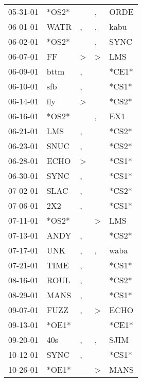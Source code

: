 \begin{supertabular}{lllll}
 05-31-01 &  *OS2* &               &             , &   ORDE \\
 06-01-01 &   WATR &             , &             , &   kabu \\
 06-02-01 &  *OS2* &               &             , &   SYNC \\
 06-07-01 &     FF &  \textgreater &  \textgreater &    LMS \\
 06-09-01 &   bttm &             , &               &  *CE1* \\
 06-10-01 &    sfb &             , &               &  *CS1* \\
 06-14-01 &    fly &  \textgreater &               &  *CS2* \\
 06-16-01 &  *OS2* &               &             , &    EX1 \\
 06-21-01 &    LMS &             , &               &  *CS2* \\
 06-23-01 &   SNUC &             , &               &  *CS2* \\
 06-28-01 &   ECHO &  \textgreater &               &  *CS1* \\
 06-30-01 &   SYNC &             , &               &  *CS1* \\
 07-02-01 &   SLAC &             , &               &  *CS2* \\
 07-06-01 &    2X2 &             , &               &  *CS1* \\
 07-11-01 &  *OS2* &               &  \textgreater &    LMS \\
 07-13-01 &   ANDY &             , &               &  *CS2* \\
 07-17-01 &    UNK &             , &             , &   waba \\
 07-21-01 &   TIME &             , &               &  *CS1* \\
 08-16-01 &   ROUL &             , &               &  *CS2* \\
 08-29-01 &   MANS &             , &               &  *CS1* \\
 09-07-01 &   FUZZ &             , &  \textgreater &   ECHO \\
 09-13-01 &  *OE1* &               &               &  *CE1* \\
 09-20-01 &    40s &             , &             , &   SJIM \\
 10-12-01 &   SYNC &             , &               &  *CS1* \\
 10-26-01 &  *OE1* &               &  \textgreater &   MANS \\

\end{supertabular}
